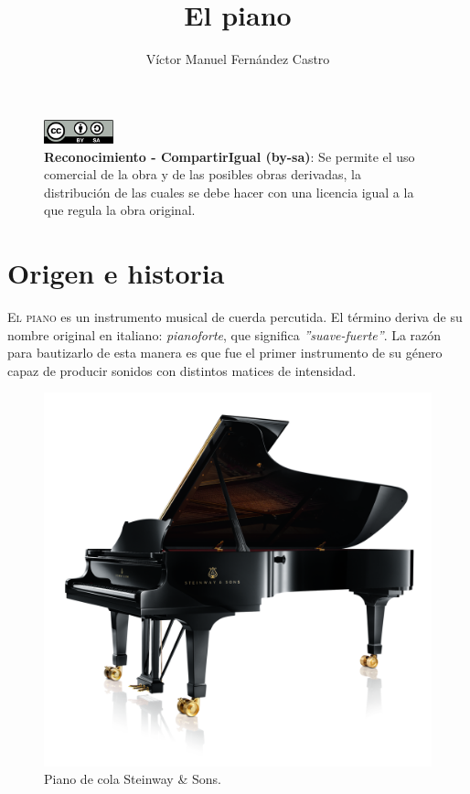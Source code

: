 \documentclass[10pt,a4paper]{article}
\title{El piano}
\author{Víctor Manuel Fernández Castro}
\begin{document}
	\maketitle
	\thispagestyle{empty}
	
	\begin{figure}[b]
		\centering
		\includegraphics[width=2cm]{images/by-sa}
		\caption*{\textbf{Reconocimiento - CompartirIgual (by-sa)}: Se permite 
		el uso comercial de la obra y de las posibles obras derivadas, la 
		distribución de las cuales se debe hacer con una licencia igual a la 
		que regula la obra original.}
	\end{figure}
	
	\newpage
	\tableofcontents
	\listoffigures
	
	
	\newpage
	\section{Origen e historia}
	
	\lettrine{E}{l piano} es un instrumento musical de cuerda percutida. El 
	término deriva de su nombre original en italiano: \textit{pianoforte}, que  
	significa \textit{''suave-fuerte''}. La razón para bautizarlo de esta 
	manera es que fue el primer instrumento de su género capaz de producir 
	sonidos con distintos matices de intensidad.
	
	\begin{figure}[!ht]
		\includegraphics[width=\textwidth]{images/piano}
		\caption[Piano de cola]{\label{fig:piano} Piano de cola Steinway \& Sons. \cite{steinway}}
	\end{figure}
	
\end{document}
